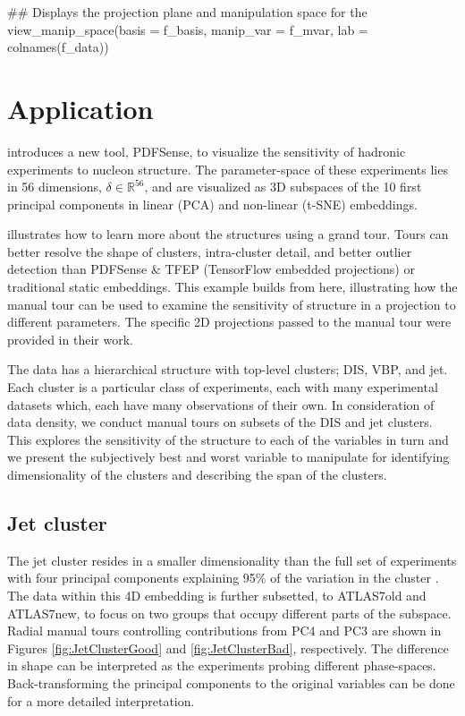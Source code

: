 \begin{Schunk}
\begin{Sinput}
## Displays the projection plane and manipulation space for the 
view_manip_space(basis = f_basis, 
                 manip_var = f_mvar, 
                 lab = colnames(f_data))
\end{Sinput}
\end{Schunk}

\hypertarget{sec:application}{%
\section{Application}\label{sec:application}}

\citet{wang_mapping_2018} introduces a new tool, PDFSense, to visualize
the sensitivity of hadronic experiments to nucleon structure. The
parameter-space of these experiments lies in 56 dimensions,
\(\delta \in \mathbb{R}^{56}\), and are visualized as 3D subspaces of
the 10 first principal components in linear (PCA) and non-linear (t-SNE)
embeddings.

\citet{cook_dynamical_2018} illustrates how to learn more about the
structures using a grand tour. Tours can better resolve the shape of
clusters, intra-cluster detail, and better outlier detection than
PDFSense \& TFEP (TensorFlow embedded projections) or traditional static
embeddings. This example builds from here, illustrating how the manual
tour can be used to examine the sensitivity of structure in a projection
to different parameters. The specific 2D projections passed to the
manual tour were provided in their work.

The data has a hierarchical structure with top-level clusters; DIS, VBP,
and jet. Each cluster is a particular class of experiments, each with
many experimental datasets which, each have many observations of their
own. In consideration of data density, we conduct manual tours on
subsets of the DIS and jet clusters. This explores the sensitivity of
the structure to each of the variables in turn and we present the
subjectively best and worst variable to manipulate for identifying
dimensionality of the clusters and describing the span of the clusters.

\hypertarget{jet-cluster}{%
\subsection{Jet cluster}\label{jet-cluster}}

The jet cluster resides in a smaller dimensionality than the full set of
experiments with four principal components explaining 95\% of the
variation in the cluster \citep{cook_dynamical_2018}. The data within
this 4D embedding is further subsetted, to ATLAS7old and ATLAS7new, to
focus on two groups that occupy different parts of the subspace. Radial
manual tours controlling contributions from PC4 and PC3 are shown in
Figures \ref{fig:JetClusterGood} and \ref{fig:JetClusterBad},
respectively. The difference in shape can be interpreted as the
experiments probing different phase-spaces. Back-transforming the
principal components to the original variables can be done for a more
detailed interpretation.

